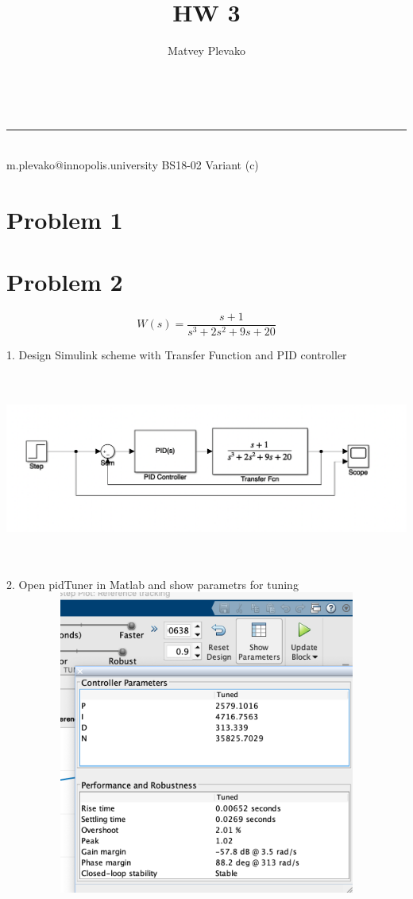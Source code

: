 \documentclass[a4paper,11pt]{article}
\makeatletter
\newcommand{\problemquestion}[1]{\gdef\@problemquestion{#1}}%
\newcommand{\linia}{\rule{\linewidth}{0.5pt}}
\theoremstyle{mytheor}
\renewcommand{\maketitle}{
\begin{center}
\vspace{2ex}
{\huge \textsc{\@title}}
\vspace{1ex}
\\
\linia\\
\@author \hspace{100ex} m.plevako@innopolis.university \hspace{100ex} BS18-02 \hspace{100ex} Variant (c)

\vspace{4ex}
\end{center}
}
\makeatother
\begin{document}
\title{HW \textnumero{} 3}

\author{Matvey Plevako}

\maketitle


\section*{Problem 1}




\section*{Problem 2}
$$W(s) = \frac{s+1}{s^3+2s^2 + 9s + 20}$$
\begin{problem}
  \problemquestion{Design a PID controller. Use step input function and try to improve rise time, overshoot and steady-state error, comparing with no controller system. Describe your actions. Use pidTuner in Matlab.}
\end{problem}
1. Design Simulink scheme with Transfer Function and PID controller
$$$$
\includegraphics[width=15.5cm, height=7cm]{simulink_pid.png}
$$$$
2. Open pidTuner in Matlab and show parametrs for tuning
$$$$
\includegraphics[width=15.5cm, height=10cm]{show_parametrs.png}
\end{document}
